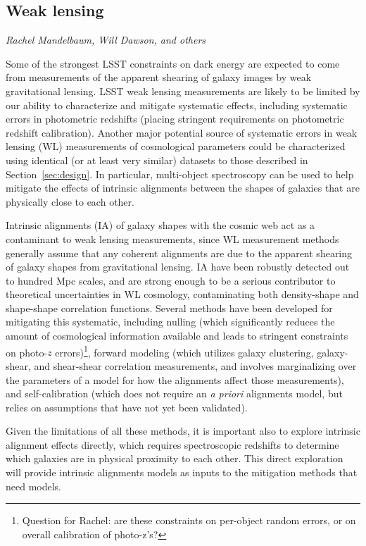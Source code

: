 \subsection{Weak lensing}
\label{sec:wl}
{\it Rachel Mandelbaum, Will Dawson, and others}


Some of the strongest LSST constraints on dark energy are expected to come from measurements of the apparent shearing of galaxy images by weak gravitational lensing.  LSST weak lensing measurements are likely to be limited by our ability to characterize and mitigate systematic effects, including systematic errors in photometric redshifts (placing stringent requirements on photometric redshift calibration).  Another major potential source of systematic errors in weak lensing (WL) measurements of cosmological parameters could be characterized using identical (or at least very similar) datasets to those described in Section~\ref{sec:design}.  In particular, multi-object spectroscopy can be
used to help mitigate the effects of intrinsic alignments between the shapes of galaxies that are physically close to each other.

Intrinsic alignments (IA) of galaxy shapes with the cosmic web act as a contaminant to weak lensing
measurements, since WL measurement methods generally assume that any coherent alignments are due to the apparent shearing of galaxy shapes from gravitational lensing. IA have
been robustly detected out to hundred Mpc scales, and are strong enough to be a serious contributor to theoretical uncertainties in WL cosmology, contaminating both density-shape and shape-shape correlation functions.  Several
methods have been developed for mitigating this systematic, including nulling (which significantly reduces the amount of
cosmological information available and leads to stringent constraints on photo-$z$ errors)\footnote{Question for Rachel: are these constraints on per-object random errors, or on overall calibration of photo-z's?}, forward modeling
(which utilizes galaxy clustering, galaxy-shear, and shear-shear correlation measurements, and involves
marginalizing over the parameters of a model for how the alignments affect those measurements), and self-calibration
(which does not require an {\em a priori} alignments model, but relies on assumptions that have
not yet been validated).  

Given the limitations of all these methods, it is important also to
explore intrinsic alignment effects directly, which requires spectroscopic redshifts to determine
which galaxies are in physical proximity to each other.  This direct exploration will provide
intrinsic alignments models as inputs to the mitigation methods that need models.  %

